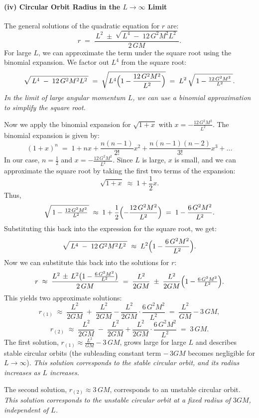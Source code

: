 \documentclass{article}
\begin{document}
\paragraph{(iv) Circular Orbit Radius in the $L \rightarrow \infty$ Limit}

The general solutions of the quadratic equation for $r$ are:
\[
r
\;=\;
\frac{\,L^2 \;\pm\; \sqrt{\,L^4 \;-\; 12\,G^2 M^2 L^2\,}}{\,2\,GM\,}.
\]
For large $L$, we can approximate the term under the square root using the binomial expansion. We factor out $L^4$ from the square root:
\[
\sqrt{\,L^4 \;-\; 12\,G^2 M^2 L^2\,}
\;=\;
\sqrt{L^4 \Bigl(1 - \frac{12\,G^2 M^2}{L^2}\Bigr)}
\;=\;
L^2\,\sqrt{\,1 - \tfrac{12\,G^2 M^2}{L^2}\,}.
\]
\textit{In the limit of large angular momentum $L$, we can use a binomial approximation to simplify the square root.}

Now we apply the binomial expansion for $\sqrt{1+x}$ with $x = -\frac{12\,G^2 M^2}{L^2}$. The binomial expansion is given by:
\[
(1+x)^n \;=\; 1 + nx + \frac{n(n-1)}{2!}x^2 + \frac{n(n-1)(n-2)}{3!}x^3 + ...
\]
In our case, $n = \frac{1}{2}$ and $x = -\frac{12\,G^2 M^2}{L^2}$. Since $L$ is large, $x$ is small, and we can approximate the square root by taking the first two terms of the expansion:
\[
\sqrt{1+x} \;\approx\; 1 + \frac{1}{2}x.
\]
Thus,
\[
\sqrt{\,1 - \tfrac{12\,G^2 M^2}{L^2}\,}
\;\approx\;
1 + \frac{1}{2}\Bigl(-\frac{12\,G^2 M^2}{L^2}\Bigr)
\;=\;
1 - \frac{6\,G^2 M^2}{L^2}.
\]
Substituting this back into the expression for the square root, we get:
\[
\sqrt{\,L^4 \;-\; 12\,G^2 M^2 L^2\,}
\;\approx\;
L^2 \Bigl(1 - \frac{6\,G^2 M^2}{L^2}\Bigr).
\]
Now we can substitute this back into the solutions for $r$:
\[
r
\;\approx\;
\frac{L^2 \,\pm\, L^2\bigl(1 - \tfrac{6\,G^2 M^2}{L^2}\bigr)}{\,2\,GM\,}
\;=\;
\frac{L^2}{2GM} \;\pm\;
\frac{L^2}{2GM}
\Bigl(1 - \tfrac{6\,G^2 M^2}{L^2}\Bigr).
\]
This yields two approximate solutions:
\[
r_{(1)}
\;\approx\;
\frac{L^2}{2GM} \;+\; \frac{L^2}{2GM} - \frac{L^2}{2GM} \cdot \frac{6\,G^2 M^2}{L^2}
\;=\;
\frac{L^2}{GM} - 3\,GM,
\]
\[
r_{(2)}
\;\approx\;
\frac{L^2}{2GM} \;-\; \frac{L^2}{2GM} + \frac{L^2}{2GM} \cdot \frac{6\,G^2 M^2}{L^2}
\;=\;
3\,GM.
\]
The first solution, $r_{(1)} \approx \tfrac{L^2}{GM} - 3\,GM$, grows large for large $L$ and describes stable circular orbits (the subleading constant term $-\,3GM$ becomes negligible for $L \to \infty$).
\textit{This solution corresponds to the stable circular orbit, and its radius increases as $L$ increases.}

The second solution, $r_{(2)} \approx 3\,GM$, corresponds to an unstable circular orbit.
\textit{This solution corresponds to the unstable circular orbit at a fixed radius of $3GM$, independent of $L$.}
\end{document}
